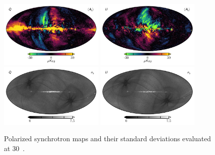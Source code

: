 \documentclass[twocolumn]{../../common/aa}
\begin{document}
\begin{figure}
	\centering
	\includegraphics[width=0.45\textwidth]{figures/synch_Q.pdf}
	\includegraphics[width=0.45\textwidth]{figures/synch_U.pdf}\\
	\includegraphics[width=0.45\textwidth]{figures/synch_Q_std.pdf}
	\includegraphics[width=0.45\textwidth]{figures/synch_U_std.pdf}\\
	\caption{Polarized synchrotron maps and their standard deviations evaluated at 30~\GHz.}\label{fig:polarized_foregrounds}
\end{figure}
\end{document}
